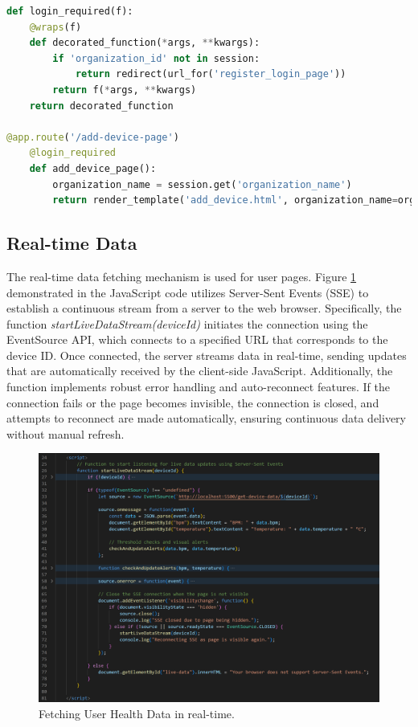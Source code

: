 \begin{lstlisting}[language=python, caption=Custom Decorator - login\_required, label=Session Management]
def login_required(f):
    @wraps(f)
    def decorated_function(*args, **kwargs):
        if 'organization_id' not in session:
            return redirect(url_for('register_login_page'))
        return f(*args, **kwargs)
    return decorated_function

@app.route('/add-device-page')
    @login_required
    def add_device_page():
        organization_name = session.get('organization_name')
        return render_template('add_device.html', organization_name=organization_name)
\end{lstlisting}


\subsection{Real-time Data}

The real-time data fetching mechanism is used for user pages. Figure \ref{fig:user-page-real-time-fetching-code} demonstrated in the JavaScript code utilizes Server-Sent Events (SSE) to establish a continuous stream from a server to the web browser. Specifically, the function \textit{startLiveDataStream(deviceId)} initiates the connection using the EventSource API, which connects to a specified URL that corresponds to the device ID. Once connected, the server streams data in real-time, sending updates that are automatically received by the client-side JavaScript. Additionally, the function implements robust error handling and auto-reconnect features. If the connection fails or the page becomes invisible, the connection is closed, and attempts to reconnect are made automatically, ensuring continuous data delivery without manual refresh.

\begin{figure}[h!]
    \centering
    \includegraphics[width=1\linewidth]{images/user-page-real-time-fetching-code.png}
    \caption{Fetching User Health Data in real-time.}
    \label{fig:user-page-real-time-fetching-code}
\end{figure}

